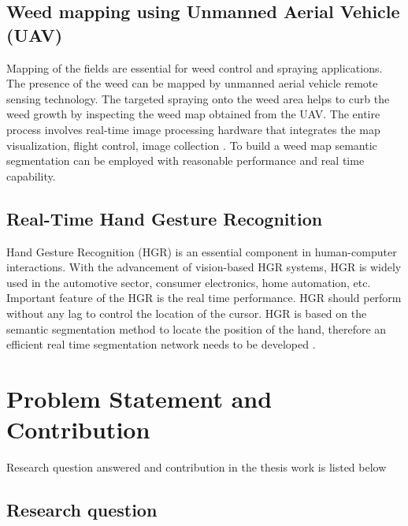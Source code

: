	\subsection{Weed mapping using Unmanned Aerial Vehicle (UAV)}
	
	Mapping of the fields are essential for weed control and spraying applications. The presence of the weed can be mapped by unmanned aerial vehicle remote sensing technology. The targeted spraying onto the weed area helps to curb the weed growth by inspecting the weed map obtained from the UAV. The entire process involves real-time image processing hardware that integrates the map visualization, flight control, image collection \cite{33_deng2020lightweight}. To build a weed map semantic segmentation can be employed with reasonable performance and real time capability. 
	
	\subsection{Real-Time Hand Gesture Recognition}
	
	Hand Gesture Recognition (HGR) is an essential component in human-computer interactions. With the advancement of vision-based HGR systems, HGR is widely used in the automotive sector, consumer electronics, home automation, etc. Important feature of the HGR is the real time performance. HGR should perform without any lag to control the location of the cursor. HGR is based on the semantic segmentation method to locate the position of the hand, therefore an efficient real time segmentation network needs to be developed \cite{34_hsieh2010real}.  
	
	\vspace{65mm} %
	
    \section{Problem Statement and Contribution}
    
    Research question answered and contribution in the thesis work is listed below
    \subsection{Research question}
    
